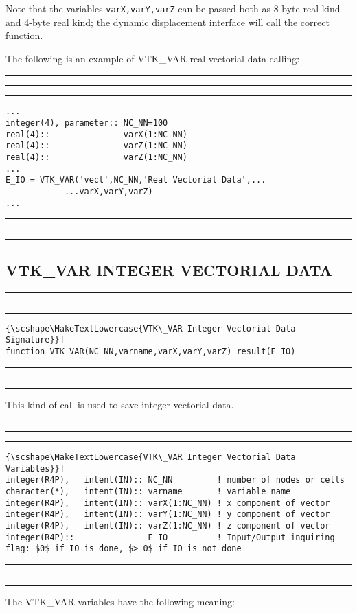 \documentclass[pagesize=pdftex,fontsize=10pt,paper=a4,oneside]{scrbook}
\DeclareRobustCommand{\MarginNote}[1]{\marginpar{%
\slshape\footnotesize%
\parindent=0pt\lineskip=0pt\lineskiplimit=0pt%
\tolerance=2000\hyphenpenalty=300\exhyphenpenalty=300%
\doublehyphendemerits=100000\finalhyphendemerits=\doublehyphendemerits%
\raggedright\hspace{0pt}#1}}
\newenvironment{boxred}[1]%
               {%
                \noindent\hspace*{-0.025\textwidth}%
                \color{Maroon}%
                \rule[-5.8pt]{0.6pt}{6pt}\hspace*{-0.6pt}\rule{1.05\textwidth}{0.6pt}\hspace*{-0.6pt}\rule[-5.8pt]{0.6pt}{6pt}%
                \color{black}%
                \vspace*{0.6pt}\MarginNote{\color{Maroon}{#1}}%
               }%
               {%
                \noindent\hspace*{-0.025\textwidth}%
                \color{Maroon}%
                \rule[0pt]{0.6pt}{6pt}\hspace*{-0.6pt}\rule{1.05\textwidth}{0.6pt}\hspace*{-0.6pt}\rule[0pt]{0.6pt}{6pt}%
                \color{black}%
                \vspace*{2mm}%
               }
\DeclareRobustCommand{\MaiuscolettoBS}[1]{\textls[80]{\scshape\MakeTextLowercase{#1}}}
\begin{document}
Note that the variables \texttt{varX,varY,varZ} can be passed both as 8-byte real kind and 4-byte real kind; the dynamic
displacement interface will call the correct function.

The following is an example of VTK\_VAR real vectorial data calling:

\begin{boxred}{VTK\_VAR Real Vectorial Data Calling}
\begin{verbatim}
...
integer(4), parameter:: NC_NN=100
real(4)::               varX(1:NC_NN)
real(4)::               varZ(1:NC_NN)
real(4)::               varZ(1:NC_NN)
...
E_IO = VTK_VAR('vect',NC_NN,'Real Vectorial Data',...
            ...varX,varY,varZ)
...
\end{verbatim}
\end{boxred}

\subsection{VTK\_VAR INTEGER VECTORIAL DATA}

\begin{boxred}{}
\begin{lstlisting}[style=signature,title=\color{Maroon}\MaiuscolettoBS{VTK\_VAR Integer Vectorial Data Signature}]
function VTK_VAR(NC_NN,varname,varX,varY,varZ) result(E_IO)
\end{lstlisting}
\end{boxred}

This kind of call is used to save integer vectorial data.

\begin{boxred}{}
\begin{lstlisting}[style=variables,title=\color{Maroon}\MaiuscolettoBS{VTK\_VAR Integer Vectorial Data Variables}]
integer(R4P),   intent(IN):: NC_NN         ! number of nodes or cells
character(*),   intent(IN):: varname       ! variable name
integer(R4P),   intent(IN):: varX(1:NC_NN) ! x component of vector
integer(R4P),   intent(IN):: varY(1:NC_NN) ! y component of vector
integer(R4P),   intent(IN):: varZ(1:NC_NN) ! z component of vector
integer(R4P)::               E_IO          ! Input/Output inquiring flag: $0$ if IO is done, $> 0$ if IO is not done
\end{lstlisting}
\end{boxred}

The VTK\_VAR variables have the following meaning:
\end{document}
